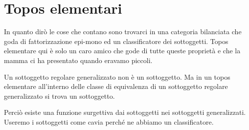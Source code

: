 \documentclass[10pt,a4paper]{amsart}
\begin{document}
\section{Topos elementari}
In quanto dirò le cose che contano sono trovarci in una categoria bilanciata che goda di fattorizzazione epi-mono ed un classificatore dei sottoggetti. Topos elementare qui è solo un caro amico che gode di tutte queste proprietà e che la mamma ci ha presentato quando eravamo piccoli. \newline

Un sottoggetto regolare generalizzato non è un sottoggetto. Ma in un topos elementare all'interno delle classe di equivalenza di un sottoggetto regolare generalizzato si trova un sottoggetto. \newline

Perciò esiste una funzione surgettiva dai sottoggetti nei sottoggetti generalizzati. Useremo i sottoggetti come cavia perché ne abbiamo un classificatore. \newline

\hrulefill
\end{document}
